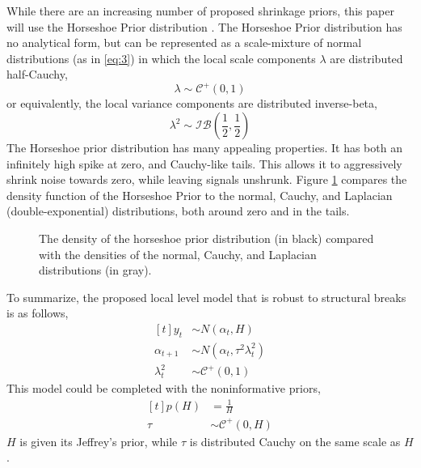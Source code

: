 \documentclass{article}
\newcommand{\paren}[1]{\ensuremath{\left(#1\right)}}
\newcommand{\dhalfcauchy}[1]{\ensuremath{\mathcal{C}^{+}\paren{#1}}}
\newcommand{\dinvbeta}[1]{\ensuremath{\mathcal{IB}\paren{#1}}}
\begin{document}
While there are an increasing number of proposed shrinkage priors, this paper will use the Horseshoe Prior distribution \parencites{CarvalhoPolsonScott2009}{CarvalhoPolsonScott2010}{PolsonScott2010}{PolsonScott2012}{DattaGhosh2012}.
The Horseshoe Prior distribution has no analytical form, but can be represented as a scale-mixture of normal distributions (as in \eqref{eq:3}) in which the local scale components $\lambda$ are distributed half-Cauchy,
\begin{equation}
  \label{eq:6}
  \lambda \sim \dhalfcauchy{0, 1}
\end{equation}
or equivalently, the local variance components are distributed inverse-beta,
\begin{equation}
  \label{eq:9}
  \lambda^{2} \sim \dinvbeta{\frac{1}{2}, \frac{1}{2}}
\end{equation}
The Horseshoe prior distribution has many appealing properties.
It has both an infinitely high spike at zero, and Cauchy-like tails.
This allows it to aggressively shrink noise towards zero, while leaving signals unshrunk.
Figure \ref{fig:horseshoe} compares the density function of the Horseshoe Prior to the normal, Cauchy, and Laplacian (double-exponential) distributions, both around zero and in the tails.
\begin{figure}
  \centering
  \caption{The density of the horseshoe prior distribution (in black) compared with the densities of the normal, Cauchy, and Laplacian distributions (in gray).}
  \label{fig:horseshoe}
\end{figure}

To summarize, the proposed local level model that is robust to structural breaks is as follows,
\begin{equation}
  \label{eq:10}
  \begin{aligned}[t]
    y_{t} &\sim N(\alpha_{t}, H) \\
    \alpha_{t + 1} &\sim N(\alpha_{t}, \tau^{2} \lambda^{2}_{t}) \\
    \lambda^{2}_{t} & \sim \dhalfcauchy{0, 1}
  \end{aligned}
\end{equation}
This model could be completed with the noninformative priors,
\begin{equation}
  \label{eq:7}
  \begin{aligned}[t]
    p(H) &= \frac{1}{H} \\
    \tau &\sim \dhalfcauchy{0, H}
  \end{aligned}
\end{equation}
$H$ is given its Jeffrey's prior, while $\tau$ is distributed Cauchy
on the same scale as $H$.
\end{document}
